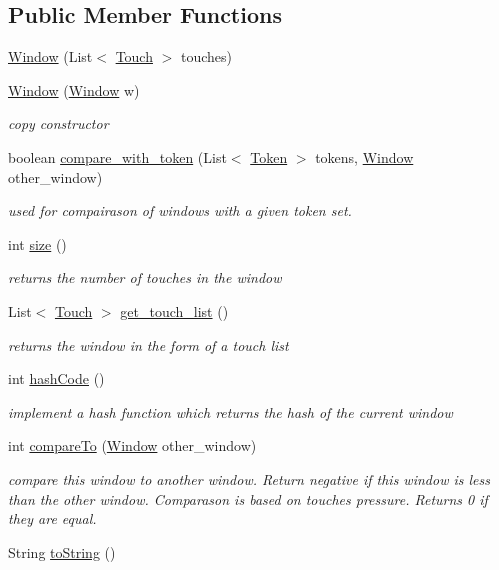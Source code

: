 \subsection*{Public Member Functions}
\begin{DoxyCompactItemize}
\item 
\hyperlink{classcomponents_1_1_window_a7ca5acd9fe649949cb0adccc837cf9d2}{Window} (List$<$ \hyperlink{classcomponents_1_1_touch}{Touch} $>$ touches)
\item 
\hyperlink{classcomponents_1_1_window_a5869fe4e3c5d711af934ff83114e55aa}{Window} (\hyperlink{classcomponents_1_1_window}{Window} w)
\begin{DoxyCompactList}\small\item\em copy constructor \end{DoxyCompactList}\item 
boolean \hyperlink{classcomponents_1_1_window_a3453a892128b5b4bded8bb7d18bbf35f}{compare\+\_\+with\+\_\+token} (List$<$ \hyperlink{classcomponents_1_1_token}{Token} $>$ tokens, \hyperlink{classcomponents_1_1_window}{Window} other\+\_\+window)
\begin{DoxyCompactList}\small\item\em used for compairason of windows with a given token set. \end{DoxyCompactList}\item 
int \hyperlink{classcomponents_1_1_window_ab553fd43fb0240c0ef8a2218bdd5092c}{size} ()
\begin{DoxyCompactList}\small\item\em returns the number of touches in the window \end{DoxyCompactList}\item 
List$<$ \hyperlink{classcomponents_1_1_touch}{Touch} $>$ \hyperlink{classcomponents_1_1_window_abde5cba55b899aca32dd46750aeb4c32}{get\+\_\+touch\+\_\+list} ()
\begin{DoxyCompactList}\small\item\em returns the window in the form of a touch list \end{DoxyCompactList}\item 
int \hyperlink{classcomponents_1_1_window_aa733aef8f3ca04b19cd9fac71096a6ff}{hash\+Code} ()
\begin{DoxyCompactList}\small\item\em implement a hash function which returns the hash of the current window \end{DoxyCompactList}\item 
int \hyperlink{classcomponents_1_1_window_acf98290f4314388936c14de8b259339a}{compare\+To} (\hyperlink{classcomponents_1_1_window}{Window} other\+\_\+window)
\begin{DoxyCompactList}\small\item\em compare this window to another window. Return negative if this window is less than the other window. Comparason is based on touches\textquotesingle{} pressure. Returns 0 if they are equal. \end{DoxyCompactList}\item 
String \hyperlink{classcomponents_1_1_window_ab46581a7a83d26f3f7cbb8ef16cc68fc}{to\+String} ()
\end{DoxyCompactItemize}



